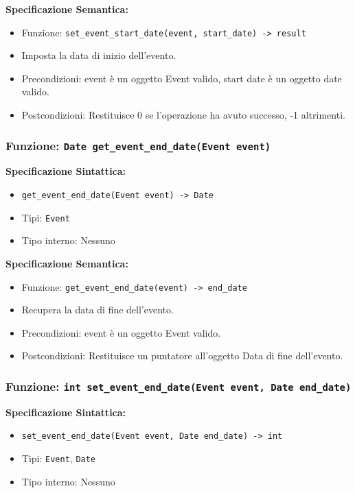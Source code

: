 \documentclass[11pt]{scrartcl} %
\begin{document}
\textbf{Specificazione Semantica:}
\begin{itemize}
\item Funzione: \texttt{set\_event\_start\_date(event, start\_date) -> result}
\item Imposta la data di inizio dell'evento.
\item Precondizioni: event è un oggetto Event valido, start date è un oggetto date valido.
\item Postcondizioni: Restituisce 0 se l'operazione ha avuto successo, -1 altrimenti.
\end{itemize}

\subsubsection{Funzione: \texttt{Date get\_event\_end\_date(Event event)}}

\textbf{Specificazione Sintattica:}
\begin{itemize}
\item \texttt{get\_event\_end\_date(Event event) -> Date}
\item Tipi: \texttt{Event}
\item Tipo interno: Nessuno
\end{itemize}

\textbf{Specificazione Semantica:}
\begin{itemize}
\item Funzione: \texttt{get\_event\_end\_date(event) -> end\_date}
\item Recupera la data di fine dell'evento.
\item Precondizioni: event è un oggetto Event valido.
\item Postcondizioni: Restituisce un puntatore all'oggetto Data di fine dell'evento.
\end{itemize}

\subsubsection{Funzione: \texttt{int set\_event\_end\_date(Event event, Date end\_date)}}

\textbf{Specificazione Sintattica:}
\begin{itemize}
\item \texttt{set\_event\_end\_date(Event event, Date end\_date) -> int}
\item Tipi: \texttt{Event}, \texttt{Date}
\item Tipo interno: Nessuno
\end{itemize}
\end{document}

